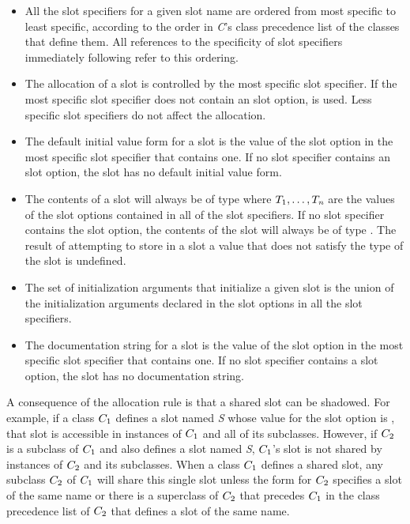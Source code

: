 \begin{itemize}

\item  All the slot specifiers for a given slot name are ordered
from most specific to least specific, according to the order in \emph{C\/}'s
class precedence list of the classes that define them. All references
to the specificity of slot specifiers immediately following refer to this
ordering.

\item  The allocation of a slot is controlled by the most specific
slot specifier.  If the most specific slot specifier does not contain an
 slot option,  is used.  Less specific
slot specifiers do not affect the allocation.

\item  The default initial value form for a
slot is the value of the  slot option in the most
specific slot specifier that contains one.  If no slot specifier
contains an  slot option, the slot has no default
initial value form.

\item  The contents of a slot will always be of type 
where $T_ 1, \ldots, T_ {\hbox{\scriptsize\it n}}$ are
the values of the  slot options contained in all of the slot
specifiers.  If no slot specifier contains the  slot option, the
contents of the slot will always be of type . The result
of attempting to store in a slot
a value that does not satisfy the type of the slot is undefined.

\item  The set of initialization arguments that initialize a given
slot is the union of the initialization arguments declared in the 
 slot options in all the slot specifiers.

\item  The documentation string for a slot is the value of the
 slot option in the most specific slot specifier
that contains one.  If no slot specifier contains a 
 slot option, the slot has no documentation string.
\end{itemize}

A consequence of the allocation rule is that a shared slot can be
shadowed.  For example, if a class $C_ 1$ defines a slot named \emph{S}
whose value for the  slot option is ,
that slot is accessible in instances of $C_ 1$ and all of its
subclasses.  However, if $C_ 2$ is a subclass of $C_ 1$ and also
defines a slot named \emph{S}, $C_ 1$'s slot is not shared
by instances of $C_ 2$ and its subclasses. When a class
$C_ 1$ defines a shared slot, any subclass $C_ 2$ of $C_
1$ will share this single slot unless the  form for
$C_ 2$ specifies a slot of the same name or there is a superclass
of $C_ 2$ that precedes $C_ 1$ in the class precedence list of
$C_ 2$ that defines a slot of the same name.

